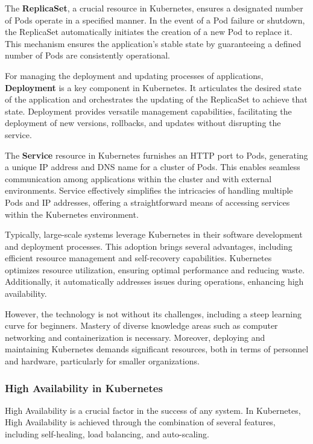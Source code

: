 The \textbf{ReplicaSet}, a crucial resource in Kubernetes, ensures a designated number of Pods operate in a specified manner.
In the event of a Pod failure or shutdown, the ReplicaSet automatically initiates the creation of a new Pod to replace it.
This mechanism ensures the application's stable state by guaranteeing a defined number of Pods are consistently operational.

For managing the deployment and updating processes of applications, \textbf{Deployment} is a key component in Kubernetes.
It articulates the desired state of the application and orchestrates the updating of the ReplicaSet to achieve that state.
Deployment provides versatile management capabilities, facilitating the deployment of new versions, rollbacks, and updates without disrupting the service.

The \textbf{Service} resource in Kubernetes furnishes an HTTP port to Pods, generating a unique IP address and DNS name for a cluster of Pods.
This enables seamless communication among applications within the cluster and with external environments.
Service effectively simplifies the intricacies of handling multiple Pods and IP addresses, offering a straightforward means of accessing services within the Kubernetes environment.

Typically, large-scale systems leverage Kubernetes in their software development and deployment processes.
This adoption brings several advantages, including efficient resource management and self-recovery capabilities.
Kubernetes optimizes resource utilization, ensuring optimal performance and reducing waste.
Additionally, it automatically addresses issues during operations, enhancing high availability.

However, the technology is not without its challenges, including a steep learning curve for beginners.
Mastery of diverse knowledge areas such as computer networking and containerization is necessary.
Moreover, deploying and maintaining Kubernetes demands significant resources, both in terms of personnel and hardware, particularly for smaller organizations.

\subsubsection{High Availability in Kubernetes}

High Availability is a crucial factor in the success of any system. In Kubernetes, High Availability is achieved through the combination of several features, including self-healing, load balancing, and auto-scaling.

